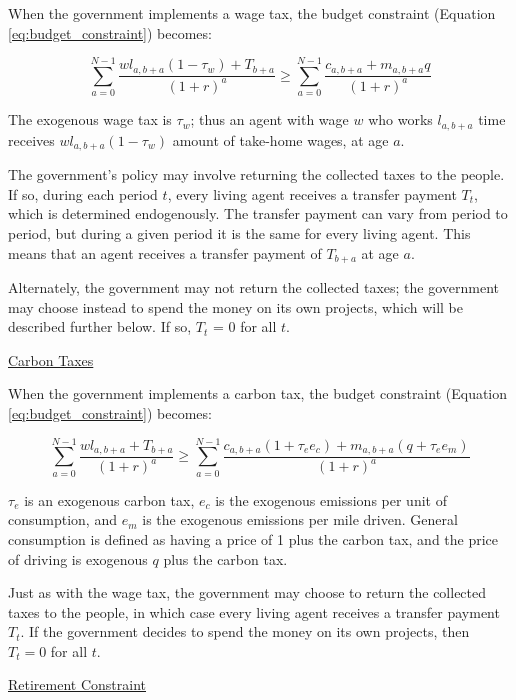 \documentclass[letter, 12pt, epsf,leqno]{article}
\begin{document}
When the government implements a wage tax, the budget constraint (Equation \ref{eq:budget_constraint}) becomes:

\begin{equation}\sum_{a=0}^{N-1} \frac{wl_{a, b+a} (1-\tau_w)+T_{b+a}}{(1+r)^{a}}  \ge \sum_{a=0}^{N-1} \frac{c_{a, b+a}+m_{a, b+a}q}{(1+r)^{a}}\end{equation}

The exogenous wage tax is $\tau_w$; thus an agent with wage $w$ who works $l_{a, b+a}$ time receives  $wl_{a,b+a}(1-\tau_w)$ amount of take-home wages, at age $a$.  

The government's policy may involve returning the collected taxes to the people.  If so, during each period $t$, every living agent receives a transfer payment $T_t$, which is determined endogenously. The transfer payment can vary from period to period, but during a given period it is the same for every living agent.  This means that an agent receives a transfer payment of $T_{b+a}$ at age $a$.

Alternately, the government may not return the collected taxes; the government may choose instead to spend the money on its own projects, which will be described further below.  If so, $T_t$ = 0 for all $t$.

\vspace{5mm}
\underline {Carbon Taxes}

When the government implements a carbon tax, the budget constraint (Equation \ref{eq:budget_constraint}) becomes:

\begin{equation}\sum_{a=0}^{N-1} \frac{wl_{a, b+a}+T_{b+a}}{(1+r)^{a}}  \ge \sum_{a=0}^{N-1} \frac{c_{a, b+a}(1+\tau_e e_c)+m_{a, b+a}(q+\tau_e e_m)}{(1+r)^{a}}\end{equation}

$\tau_e$ is an exogenous carbon tax, $e_c$ is the exogenous emissions per unit of consumption, and $e_m$ is the exogenous emissions per mile driven.  General consumption is defined as having a price of 1 plus the carbon tax, and the price of driving is exogenous $q$ plus the carbon tax.

Just as with the wage tax, the government may choose to return the collected taxes to the people, in which case every living agent receives a transfer payment $T_t$.  If the government decides to spend the money on its own projects, then $T_t=0$ for all $t$.

\vspace{5mm}
\underline{Retirement Constraint}
\end{document}
